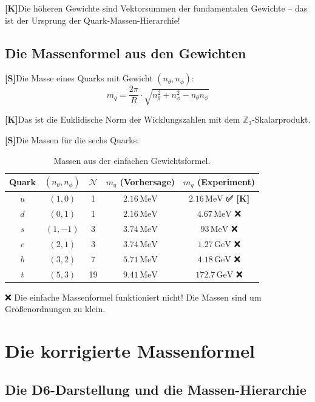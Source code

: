 \documentclass[11pt,a4paper]{article}
\newcommand{\Kstatus}{\textbf{[K]}}
\newcommand{\Sstatus}{\textbf{[S]}}
\newcommand{\Checkmark}{\textbf{✅ [K]}}
\begin{document}
	\Kstatus Die höheren Gewichte sind Vektorsummen der fundamentalen Gewichte -- das ist der Ursprung der Quark-Massen-Hierarchie!
	
	\subsection{Die Massenformel aus den Gewichten}
	
	\Sstatus Die Masse eines Quarks mit Gewicht $(n_\theta, n_\phi)$:
	\begin{equation}
		m_q = \frac{2\pi}{R} \cdot \sqrt{n_\theta^2 + n_\phi^2 - n_\theta n_\phi}
	\end{equation}
	
	\Kstatus Das ist die Euklidische Norm der Wicklungszahlen mit dem $\mathbb{Z}_3$-Skalarprodukt.
	
	\Sstatus Die Massen für die sechs Quarks:
	
	\begin{table}[h!]
		\centering
		\caption{Massen aus der einfachen Gewichtsformel.}
		\label{tab:simple_masses}
		\begin{tabular}{c c c c c}
			\toprule
			\textbf{Quark} & $(n_\theta, n_\phi)$ & $\mathcal{N}$ & $m_q$ (Vorhersage) & $m_q$ (Experiment) \\
			\midrule
			$u$ & $(1, 0)$ & 1 & $2.16\,\text{MeV}$ & $2.16\,\text{MeV}$ \Checkmark \\
			$d$ & $(0, 1)$ & 1 & $2.16\,\text{MeV}$ & $4.67\,\text{MeV}$ ❌ \\
			$s$ & $(1, -1)$ & 3 & $3.74\,\text{MeV}$ & $93\,\text{MeV}$ ❌ \\
			$c$ & $(2, 1)$ & 3 & $3.74\,\text{MeV}$ & $1.27\,\text{GeV}$ ❌ \\
			$b$ & $(3, 2)$ & 7 & $5.71\,\text{MeV}$ & $4.18\,\text{GeV}$ ❌ \\
			$t$ & $(5, 3)$ & 19 & $9.41\,\text{MeV}$ & $172.7\,\text{GeV}$ ❌ \\
			\bottomrule
		\end{tabular}
	\end{table}
	
	❌ Die einfache Massenformel funktioniert nicht! Die Massen sind um Größenordnungen zu klein.
	
	\section{Die korrigierte Massenformel}
	
	\subsection{Die D6-Darstellung und die Massen-Hierarchie}
	
\end{document}

